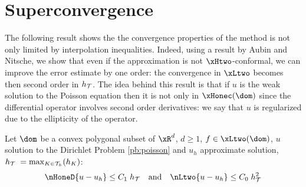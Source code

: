 \section{Superconvergence}

The following result shows the the convergence properties of the method is not only limited by interpolation inequalities.
Indeed, using a result by Aubin and Nitsche, we show that even if the approximation is not $\xHtwo$-conformal, we can improve the error estimate by one order: the convergence in $\xLtwo$ becomes then second order in $h_{\mathcal T}$.
The idea behind this result is that if $u$ is the weak solution to the Poisson equation then it is not only in $\xHonec(\dom)$ since the differential operator involves second order derivatives: we say that $u$ is regularized due to the ellipticity of the operator.

\begin{thrm}[Superconvergence]
Let $\dom$ be a convex polygonal subset of $\xR^d$, $d \geq 1$, $f \in \xLtwo(\dom)$, $u$ solution to the Dirichlet Problem \eqref{pb:poisson} and $u_h$ approximate solution, $h_{\mathcal T}\;= \max_{K\in{\mathcal T}_h}(h_K)$:
\begin{equation*}
\nHoneD{u - u_h}  \leq C_1\;\sizeT\quad\mbox{and}\quad\nLtwo{u - u_h}  \leq C_0\;\sizeT^2
\end{equation*}
\end{thrm}

